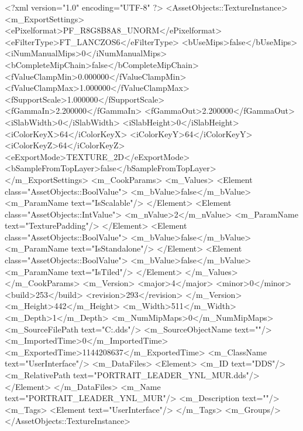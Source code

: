 <?xml version="1.0" encoding="UTF-8" ?>
<AssetObjects::TextureInstance>
	<m_ExportSettings>
		<ePixelformat>PF_R8G8B8A8_UNORM</ePixelformat>
		<eFilterType>FT_LANCZOS6</eFilterType>
		<bUseMips>false</bUseMips>
		<iNumManualMips>0</iNumManualMips>
		<bCompleteMipChain>false</bCompleteMipChain>
		<fValueClampMin>0.000000</fValueClampMin>
		<fValueClampMax>1.000000</fValueClampMax>
		<fSupportScale>1.000000</fSupportScale>
		<fGammaIn>2.200000</fGammaIn>
		<fGammaOut>2.200000</fGammaOut>
		<iSlabWidth>0</iSlabWidth>
		<iSlabHeight>0</iSlabHeight>
		<iColorKeyX>64</iColorKeyX>
		<iColorKeyY>64</iColorKeyY>
		<iColorKeyZ>64</iColorKeyZ>
		<eExportMode>TEXTURE_2D</eExportMode>
		<bSampleFromTopLayer>false</bSampleFromTopLayer>
	</m_ExportSettings>
	<m_CookParams>
		<m_Values>
			<Element class="AssetObjects::BoolValue">
				<m_bValue>false</m_bValue>
				<m_ParamName text="IsScalable"/>
			</Element>
			<Element class="AssetObjects::IntValue">
				<m_nValue>2</m_nValue>
				<m_ParamName text="TexturePadding"/>
			</Element>
			<Element class="AssetObjects::BoolValue">
				<m_bValue>false</m_bValue>
				<m_ParamName text="IsStandalone"/>
			</Element>
			<Element class="AssetObjects::BoolValue">
				<m_bValue>false</m_bValue>
				<m_ParamName text="IsTiled"/>
			</Element>
		</m_Values>
	</m_CookParams>
	<m_Version>
		<major>4</major>
		<minor>0</minor>
		<build>253</build>
		<revision>293</revision>
	</m_Version>
	<m_Height>442</m_Height>
	<m_Width>511</m_Width>
	<m_Depth>1</m_Depth>
	<m_NumMipMaps>0</m_NumMipMaps>
	<m_SourceFilePath text="C:\Users\sseckman\Documents\Meow.dds"/>
	<m_SourceObjectName text=""/>
	<m_ImportedTime>0</m_ImportedTime>
	<m_ExportedTime>1144208637</m_ExportedTime>
	<m_ClassName text="UserInterface"/>
	<m_DataFiles>
		<Element>
			<m_ID text="DDS"/>
			<m_RelativePath text="PORTRAIT_LEADER_YNL_MUR.dds"/>
		</Element>
	</m_DataFiles>
	<m_Name text="PORTRAIT_LEADER_YNL_MUR"/>
	<m_Description text=""/>
	<m_Tags>
		<Element text="UserInterface"/>
	</m_Tags>
	<m_Groups/>
</AssetObjects::TextureInstance>

 